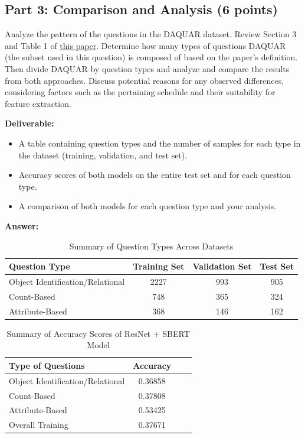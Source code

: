 \documentclass[11pt, oneside]{article}   	%
\begin{document}
\subsection*{Part 3: Comparison and Analysis (6 points)}

Analyze the pattern of the questions in the DAQUAR dataset. Review Section 3 and Table 1 of \href{https://openaccess.thecvf.com/content_ICCV_2017/papers/Kafle_An_Analysis_of_ICCV_2017_paper.pdf}{this paper}. Determine how many types of questions DAQUAR (the subset used in this question) is composed of based on the paper's definition. Then divide DAQUAR by question types and analyze and compare the results from both approaches. Discuss potential reasons for any observed differences, considering factors such as the pertaining schedule and their suitability for feature extraction.

\noindent\textbf{Deliverable:}
\begin{itemize}
\item A table containing question types and the number of samples for each type in the dataset (training, validation, and test set).
\item Accuracy scores of both models on the entire test set and for each question type.
\item A comparison of both models for each question type and your analysis.
\end{itemize}


\textbf{Answer:} \\
\begin{table}[h!]
    \centering
    \begin{tabular}{|l|c|c|c|}
    \hline
    \textbf{Question Type} & \textbf{Training Set} & \textbf{Validation Set} & \textbf{Test Set} \\ \hline
    Object Identification/Relational & 2227 & 993 & 905 \\ \hline
    Count-Based & 748 & 365 & 324 \\ \hline
    Attribute-Based & 368 & 146 & 162 \\ \hline
    \end{tabular}
    \caption{Summary of Question Types Across Datasets}
    \label{tab:question_type_summary}
\end{table}

\begin{table}[h!]
    \centering
    \begin{tabular}{|l|c|c|c|}
    \hline
    \textbf{Type of Questions} & \textbf{Accuracy} \\ \hline
    Object Identification/Relational & 0.36858 \\ \hline
    Count-Based & 0.37808 \\ \hline
    Attribute-Based & 0.53425 \\ \hline
    Overall Training & 0.37671 \\ \hline
    \end{tabular}
    \caption{Summary of Accuracy Scores of ResNet + SBERT Model}
    \label{tab:question_type_summary}
\end{table}
\end{document}
